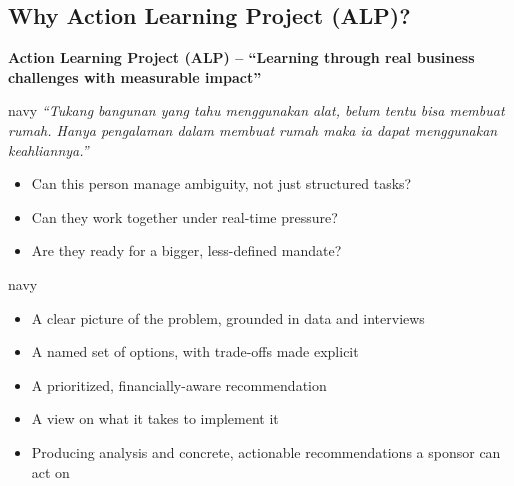 \subsection{Why Action Learning Project (ALP)?}
\begin{tcolorbox}[colback=lightgray,colframe=lightgray,arc=2mm]\centering
\textbf{Action Learning Project (ALP) -- ``Learning through real business challenges with measurable impact''}\par\medskip
{}
\end{tcolorbox}
\begin{tcbraster}[raster columns=2,raster equal height=rows,raster column skip=3mm]
\begin{infobox}{navy}
\textit{``Tukang bangunan yang tahu menggunakan alat, belum tentu bisa membuat rumah. Hanya pengalaman dalam membuat rumah maka ia dapat menggunakan keahliannya.''}
\begin{itemize}
\item Can this person manage ambiguity, not just structured tasks?
\item Can they work together under real-time pressure?
\item Are they ready for a bigger, less-defined mandate?
\end{itemize}
\end{infobox}
\begin{infobox}{navy}
\begin{itemize}[label=$\checkmark$]
\item A clear picture of the problem, grounded in data and interviews
\item A named set of options, with trade-offs made explicit
\item A prioritized, financially-aware recommendation
\item A view on what it takes to implement it
\item Producing analysis and concrete, actionable recommendations a sponsor can act on
\end{itemize}
\end{infobox}
\end{tcbraster}
